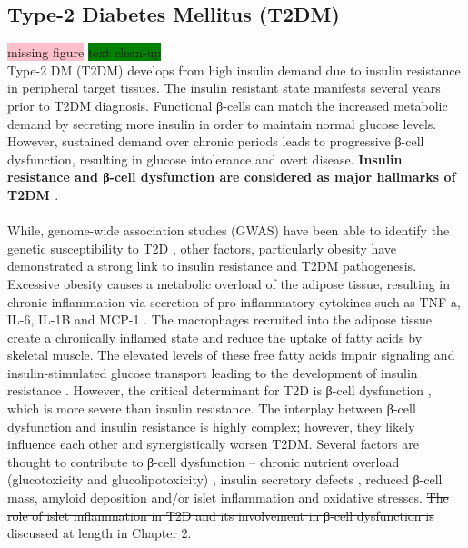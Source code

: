 \subsection{Type-2 Diabetes Mellitus (T2DM)}
\label{sec:t2dm}
\colorbox{pink}{missing figure} \colorbox{green}{text clean-up} \\

Type-2 DM (T2DM) develops from high insulin demand due to insulin resistance in peripheral target tissues. The insulin resistant state manifests several years prior to T2DM diagnosis. Functional β-cells can match the increased metabolic demand by secreting more insulin in order to maintain normal glucose levels. However, sustained demand over chronic periods leads to progressive β-cell dysfunction, resulting in glucose intolerance and overt disease. \textbf{Insulin resistance and β-cell dysfunction are considered as major hallmarks of T2DM \cite{banday_pathophysiology_2020}}. 
\\\\
While, genome-wide association studies (GWAS) have been able to identify the genetic susceptibility to T2D \textbf{\cite{grarup_genetic_2014, wang_genetic_2016}}, other factors, particularly obesity have demonstrated a strong link to insulin resistance and T2DM pathogenesis. Excessive obesity causes a metabolic overload of the adipose tissue, resulting in chronic inflammation via secretion of pro-inflammatory cytokines such as TNF-a, IL-6, IL-1B and MCP-1 \textbf{\cite{guilherme_adipocyte_2008}}. The macrophages recruited into the adipose tissue create a chronically inflamed state and reduce the uptake of fatty acids by skeletal muscle. The elevated levels of these free fatty acids impair signaling and insulin-stimulated glucose transport leading to the development of insulin resistance \textbf{\cite{unger_lipotoxicity_1995,uysal_protection_1997,kanda_mcp-1_2006}}. However, the critical determinant for T2D is β-cell dysfunction \textbf{\cite{tahrani_glycaemic_2010, khin_pancreatic_2023}}, which is more severe than insulin resistance. The interplay between β-cell dysfunction and insulin resistance is highly complex; however, they likely influence each other and synergistically worsen T2DM.  Several factors are thought to contribute to β-cell dysfunction – chronic nutrient overload (glucotoxicity and glucolipotoxicity) \textbf{\cite{prentki_nutrient-induced_2020}}, insulin secretory defects \textbf{\cite{kahn_mechanisms_2006}}, reduced β-cell mass, amyloid deposition \textbf{\cite{prentki_islet_2006}} and/or islet inflammation and oxidative stresses. \st{The role of islet inflammation in T2D and its involvement in β-cell dysfunction is discussed at length in Chapter 2.}
